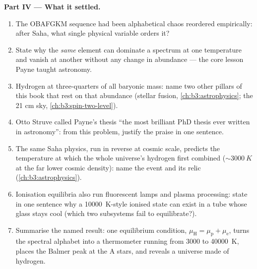\begin{problem}
\medskip\noindent\textbf{Part IV --- What it settled.}
\begin{enumerate}[resume]
  \item The OBAFGKM sequence had been alphabetical chaos
        reordered empirically: after Saha, what single physical
        variable orders it?
  \item State why the \emph{same} element can dominate a
        spectrum at one temperature and vanish at another without
        any change in abundance --- the core lesson Payne taught
        astronomy.
  \item Hydrogen at three-quarters of all baryonic mass: name two
        other pillars of this book that rest on that abundance
        (stellar fusion, \cref{ch:b3:astrophysics}; the 21 cm
        sky, \cref{ch:b3:spin-two-level}).
  \item Otto Struve called Payne's thesis ``the most brilliant
        PhD thesis ever written in astronomy'': from this
        problem, justify the praise in one sentence.
  \item The same Saha physics, run in reverse at cosmic scale,
        predicts the temperature at which the whole universe's
        hydrogen first combined ($\sim\qty{3000}{K}$ at the far
        lower cosmic density): name the event and its relic
        (\cref{ch:b3:astrophysics}).
  \item Ionisation equilibria also run fluorescent lamps and
        plasma processing: state in one sentence why a
        \qty{10000}{K}-style ionised state can exist in a tube
        whose glass stays cool (which two subsystems fail to
        equilibrate?).
  \item Summarise the named result: one equilibrium condition,
        $\mu_{\text{H}} = \mu_{\text{p}} + \mu_{\text{e}}$, turns
        the spectral alphabet into a thermometer running from
        $3000$ to \qty{40000}{K}, places the Balmer peak at the A
        stars, and reveals a universe made of hydrogen.
\end{enumerate}
\end{problem}
